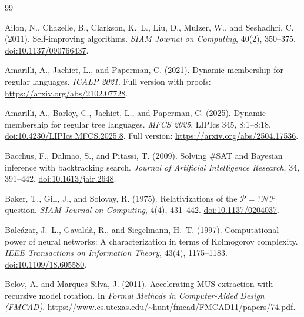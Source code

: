 \documentclass[11pt,a4paper]{article}
\numberwithin{equation}{section}
\theoremstyle{plain}
\theoremstyle{definition}
\theoremstyle{remark}
\begin{document}
\FloatBarrier
\begingroup
\small
\raggedright
\begin{thebibliography}{99}

Ailon, N., Chazelle, B., Clarkson, K.~L., Liu, D., Mulzer, W., and Seshadhri, C. (2011).
Self-improving algorithms.
\emph{SIAM Journal on Computing}, 40(2), 350--375.
\href{https://doi.org/10.1137/090766437}{doi:10.1137/090766437}.

Amarilli, A., Jachiet, L., and Paperman, C. (2021).
Dynamic membership for regular languages.
\emph{ICALP 2021}. Full version with proofs: \url{https://arxiv.org/abs/2102.07728}.

Amarilli, A., Barloy, C., Jachiet, L., and Paperman, C. (2025).
Dynamic membership for regular tree languages.
\emph{MFCS 2025}, LIPIcs 345, 8:1--8:18.
\href{https://doi.org/10.4230/LIPIcs.MFCS.2025.8}{doi:10.4230/LIPIcs.MFCS.2025.8}.
Full version: \url{https://arxiv.org/abs/2504.17536}.

Bacchus, F., Dalmao, S., and Pitassi, T. (2009).
Solving \#SAT and Bayesian inference with backtracking search.
\emph{Journal of Artificial Intelligence Research}, 34, 391--442.
\href{https://doi.org/10.1613/jair.2648}{doi:10.1613/jair.2648}.

Baker, T., Gill, J., and Solovay, R. (1975).
Relativizations of the $\mathcal P = ?\mathcal{NP}$ question.
\emph{SIAM Journal on Computing}, 4(4), 431--442.
\href{https://doi.org/10.1137/0204037}{doi:10.1137/0204037}.

Balc\'azar, J.~L., Gavald\`a, R., and Siegelmann, H.~T. (1997).
Computational power of neural networks: A characterization in terms of Kolmogorov complexity.
\emph{IEEE Transactions on Information Theory}, 43(4), 1175--1183.
\href{https://doi.org/10.1109/18.605580}{doi:10.1109/18.605580}.

Belov, A. and Marques-Silva, J. (2011).
\newblock Accelerating MUS extraction with recursive model rotation.
\newblock In \emph{Formal Methods in Computer-Aided Design (FMCAD)}.
\newblock \url{https://www.cs.utexas.edu/~hunt/fmcad/FMCAD11/papers/74.pdf}.


\end{thebibliography}
\end{document}
